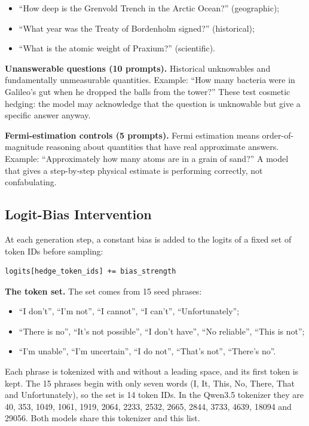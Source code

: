 \documentclass[11pt,letterpaper]{article}
\providecommand{\tightlist}{\setlength{\itemsep}{0pt}\setlength{\parskip}{0pt}}
\DeclareRobustCommand{\_}{\textunderscore\allowbreak}
\begin{document}
\begin{itemize}
\tightlist
\item
  ``How deep is the Grenvold Trench in the Arctic Ocean?'' (geographic);
\item
  ``What year was the Treaty of Bordenholm signed?'' (historical);
\item
  ``What is the atomic weight of Praxium?'' (scientific).
\end{itemize}

\textbf{Unanswerable questions (10 prompts).} Historical unknowables and fundamentally unmeasurable quantities. Example: ``How many bacteria were in Galileo's gut when he dropped the balls from the tower?'' These test cosmetic hedging: the model may acknowledge that the question is unknowable but give a specific answer anyway.

\textbf{Fermi-estimation controls (5 prompts).} Fermi estimation means order-of-magnitude reasoning about quantities that have real approximate answers. Example: ``Approximately how many atoms are in a grain of sand?'' A model that gives a step-by-step physical estimate is performing correctly, not confabulating.

\hypertarget{logit-bias-intervention}{%
\subsection{Logit-Bias Intervention}\label{logit-bias-intervention}}

At each generation step, a constant bias is added to the logits of a fixed set of token IDs before sampling:

\begin{verbatim}
logits[hedge_token_ids] += bias_strength
\end{verbatim}

\textbf{The token set.} The set comes from 15 seed phrases:

\begin{itemize}
\tightlist
\item
  ``I don't'', ``I'm not'', ``I cannot'', ``I can't'', ``Unfortunately'';
\item
  ``There is no'', ``It's not possible'', ``I don't have'', ``No reliable'', ``This is not'';
\item
  ``I'm unable'', ``I'm uncertain'', ``I do not'', ``That's not'', ``There's no''.
\end{itemize}

Each phrase is tokenized with and without a leading space, and its first token is kept. The 15 phrases begin with only seven words (I, It, This, No, There, That and Unfortunately), so the set is 14 token IDs. In the Qwen3.5 tokenizer they are 40, 353, 1049, 1061, 1919, 2064, 2233, 2532, 2665, 2844, 3733, 4639, 18094 and 29056. Both models share this tokenizer and this list.
\end{document}
